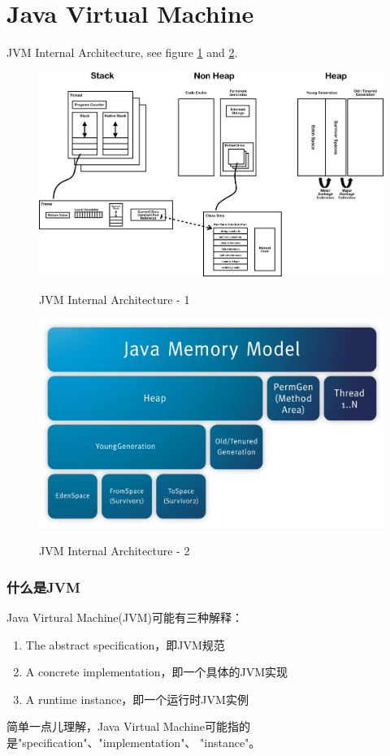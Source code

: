 \documentclass[a4paper,11pt]{article}
\begin{document}
\part[JVM]{Java Virtual Machine}
JVM Internal Architecture, see figure \ref{fig:jvm} and \ref{fig:jvm2}.
\begin{figure}
  \centering
  \includegraphics[width=\textwidth]{picturedir/JVMInternalArchitecture.png}\\
  \caption{JVM Internal Architecture - 1}\label{fig:jvm}
\end{figure}

\begin{figure}
  \centering
  \includegraphics[width=\textwidth]{picturedir/JVMRuntimeDataArea.png}\\
  \caption{JVM Internal Architecture - 2}\label{fig:jvm2}
\end{figure}

\section[What is JVM]{什么是JVM}
Java Virtural Machine(JVM)可能有三种解释：
\begin{enumerate}
  \item The abstract specification，即JVM规范
  \item A concrete implementation，即一个具体的JVM实现
  \item A runtime instance，即一个运行时JVM实例
\end{enumerate}
简单一点儿理解，Java Virtual Machine可能指的是"specification"、"implementation"、
"instance"。
\end{document}
